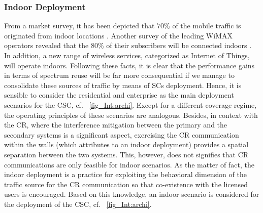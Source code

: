 \subsubsection*{Indoor Deployment}
From a market survey, it has been depicted that $70\%$ of the mobile traffic is originated from indoor locations \cite{Chander08}. Another survey of the leading WiMAX operators revealed that the $80\%$ of their subscribers will be connected indoors \cite{Pao07}. In addition, a new range of wireless services, categorized as Internet of Things, will operate indoors. Following these facts, it is clear that the performance gains in terms of spectrum reuse will be far more consequential if we manage to consolidate these sources of traffic by means of SCs deployment. Hence, it is sensible to consider the residential and enterprise as the main deployment scenarios for the CSC, cf. \figurename~\ref{fig_Int:archi}. Except for a different coverage regime, the operating principles of these scenarios are analogous. Besides, in context with the CR, where the interference mitigation between the primary and the secondary systems is a significant aspect, exercising the CR communication within the walls (which attributes to an indoor deployment) provides a spatial separation between the two systems. This, however, does not signifies that CR communications are only feasible for indoor scenarios. As the matter of fact, the indoor deployment is a practice for exploiting the behavioral dimension of the traffic source for the CR communication so that co-existence with the licensed users is encouraged. 
Based on this knowledge, an indoor scenario is considered for the deployment of the CSC, cf. \figurename~\ref{fig_Int:archi}.  

